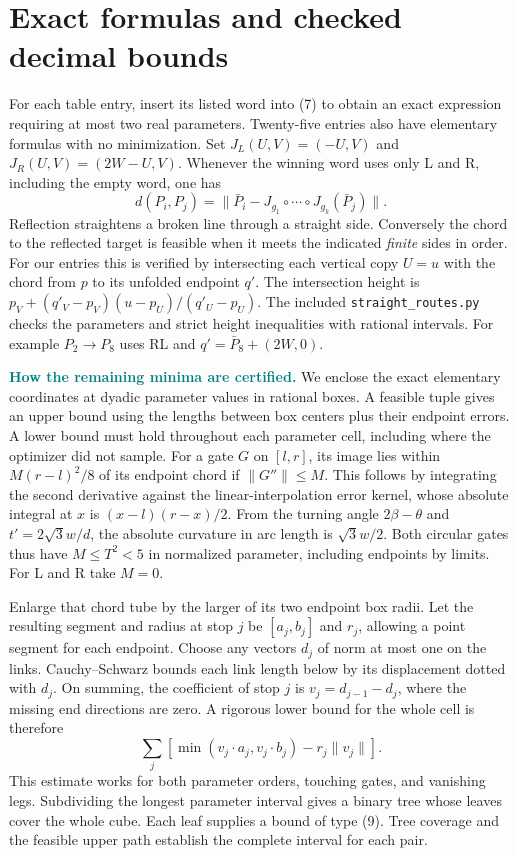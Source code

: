\documentclass[11pt,letterpaper]{article}
\newcommand{\heading}[1]{\section*{\color{ink}#1}}
\newcommand{\para}[1]{\smallskip\noindent\textcolor{teal}{\textbf{#1}}\enspace}
\newcommand{\norm}[1]{\lVert #1\rVert}
\newcommand{\rt}{\sqrt{3}}
\begin{document}
\newpage
\heading{Exact formulas and checked decimal bounds}
For each table entry, insert its listed word into (7) to obtain an exact expression requiring at most two real parameters. Twenty-five entries also have elementary formulas with no minimization. Set $J_L(U,V)=(-U,V)$ and $J_R(U,V)=(2W-U,V)$. Whenever the winning word uses only L and R, including the empty word, one has
\[
 d(P_i,P_j)=\norm{\bar P_i-J_{g_1}\circ\cdots\circ J_{g_k}(\bar P_j)}.
 \tag{8}
\]
Reflection straightens a broken line through a straight side. Conversely the chord to the reflected target is feasible when it meets the indicated \emph{finite} sides in order. For our entries this is verified by intersecting each vertical copy $U=u$ with the chord from $p$ to its unfolded endpoint $q'$. The intersection height is $p_V+(q'_V-p_V)(u-p_U)/(q'_U-p_U)$. The included \texttt{straight\_routes.py} checks the parameters and strict height inequalities with rational intervals. For example $P_2\to P_8$ uses RL and $q'=\bar P_8+(2W,0)$.

\para{How the remaining minima are certified.} We enclose the exact elementary coordinates at dyadic parameter values in rational boxes. A feasible tuple gives an upper bound using the lengths between box centers plus their endpoint errors. A lower bound must hold throughout each parameter cell, including where the optimizer did not sample. For a gate $G$ on $[l,r]$, its image lies within $M(r-l)^2/8$ of its endpoint chord if $\norm{G''}\le M$. This follows by integrating the second derivative against the linear-interpolation error kernel, whose absolute integral at $x$ is $(x-l)(r-x)/2$. From the turning angle $2\beta-\theta$ and $t'=2\rt w/d$, the absolute curvature in arc length is $\rt w/2$. Both circular gates thus have $M\le T^2<5$ in normalized parameter, including endpoints by limits. For L and R take $M=0$.

Enlarge that chord tube by the larger of its two endpoint box radii. Let the resulting segment and radius at stop $j$ be $[a_j,b_j]$ and $r_j$, allowing a point segment for each endpoint. Choose any vectors $d_j$ of norm at most one on the links. Cauchy--Schwarz bounds each link length below by its displacement dotted with $d_j$. On summing, the coefficient of stop $j$ is $v_j=d_{j-1}-d_j$, where the missing end directions are zero. A rigorous lower bound for the whole cell is therefore
\[
 \sum_j \left[\min(v_j\!\cdot a_j,v_j\!\cdot b_j)-r_j\norm{v_j}\right].
 \tag{9}
\]
This estimate works for both parameter orders, touching gates, and vanishing legs. Subdividing the longest parameter interval gives a binary tree whose leaves cover the whole cube. Each leaf supplies a bound of type (9). Tree coverage and the feasible upper path establish the complete interval for each pair.
\end{document}
